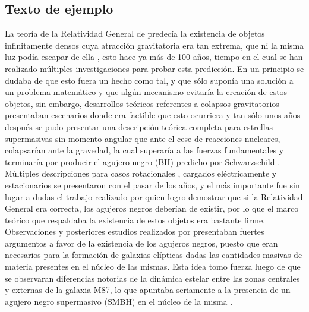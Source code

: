 \documentclass[11pt,letterpaper]{article}
\begin{document}
\subsection*{Texto de ejemplo}
La teoría de la Relatividad General de \cite{Einstein1915} predecía la existencia de objetos infinitamente densos cuya atracción gravitatoria era tan extrema, que ni la misma luz podía escapar de ella \citep{Schwarzschild_2003}, esto hace ya más de 100 años, tiempo en el cual se han realizado múltiples investigaciones para probar esta predicción. En un principio se dudaba de que esto fuera un hecho como tal, y que sólo suponía una solución a un problema matemático y que algún mecanismo evitaría la creación de estos objetos, sin embargo, desarrollos teóricos referentes a colapsos gravitatorios presentaban escenarios donde era factible que esto ocurriera \citep{10.1093/mnras/91.5.456} y tan sólo unos años después se pudo presentar una descripción teórica completa para estrellas supermasivas sin momento angular que ante el cese de reacciones nucleares, colapsarían ante la gravedad, la cual superaría a las fuerzas fundamentales y terminaría por producir el agujero negro (BH) predicho por Schwarzschild \citep{PhysRev.56.455}. Múltiples descripciones para casos rotacionales \citep{PhysRevLett.11.237}, cargados eléctricamente \citep{newman1965metric} y estacionarios \citep{israel1967event} se presentaron con el pasar de los años, y el más importante fue sin lugar a dudas el trabajo realizado por \cite{PhysRevLett.14.57} quien logro demostrar que si la Relatividad General era correcta, los agujeros negros deberían de existir, por lo que el marco teórico que respaldaba la existencia de estos objetos era bastante firme.\\
Observaciones y posteriores estudios realizados por \cite{1970ApJ...161..419W} presentaban fuertes argumentos a favor de la existencia de los agujeros negros, puesto que eran necesarios para la formación de galaxias elípticas dadas las cantidades masivas de materia presentes en el núcleo de las mismas. Esta idea tomo fuerza luego de que se observaran diferencias notorias de la dinámica estelar entre las zonas centrales y externas de la galaxia M87, lo que apuntaba seriamente a la presencia de un agujero negro supermasivo (SMBH) en el núcleo de la misma \citep{sargent1978dynamical}.\\
\end{document}
